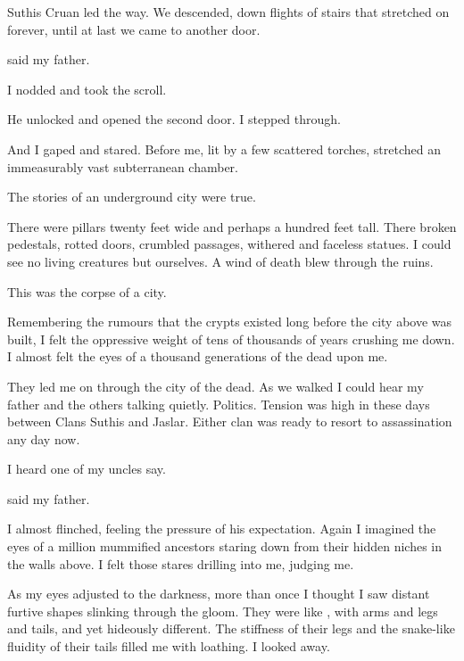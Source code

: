 \documentclass
  [a4paper,
   12pt,
   oneside
  ]%
  {article}
\begin{document}
Suthis Cruan led the way.
We descended, down flights of stairs that stretched on forever, until at last we came to another door. 

 said my father.

I nodded and took the scroll. 

He unlocked and opened the second door.
I stepped through.

And I gaped and stared. 
Before me, lit by a few scattered torches, stretched an immeasurably vast subterranean chamber. 
 
The stories of an underground city were true. 

There were pillars twenty feet wide and perhaps a hundred feet tall. 
There broken pedestals, rotted doors, crumbled passages, withered and faceless statues. 
I could see no living creatures but ourselves. 
A wind of death blew through the ruins. 

This was the corpse of a city. 

Remembering the rumours that the crypts existed long before the city above was built, I felt the oppressive weight of tens of thousands of years crushing me down. 
I almost felt the eyes of a thousand generations of the dead upon me.

They led me on through the city of the dead.
As we walked I could hear my father and the others talking quietly. 
Politics.
Tension was high in these days between Clans Suthis and Jaslar. 
Either clan was ready to resort to assassination any day now. 

 I heard one of my uncles say.

 said my father. 

I almost flinched, feeling the pressure of his expectation.
Again I imagined the eyes of a million mummified ancestors staring down from their hidden niches in the walls above. 
I felt those stares drilling into me, judging me. 

As my eyes adjusted to the darkness, more than once I thought I saw distant furtive shapes slinking through the gloom.
They were like \scathae, with arms and legs and tails, and yet hideously different. 
The stiffness of their legs and the snake-like fluidity of their tails filled me with loathing.
I looked away. 
\end{document}
